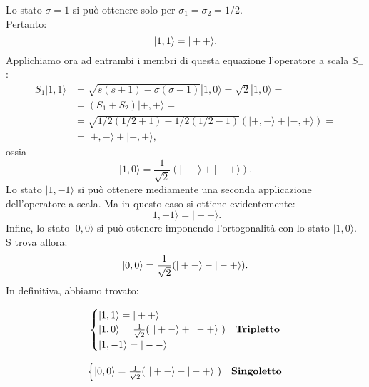 Lo stato $\sigma=1$ si può ottenere solo per $\sigma_1=\sigma_2=1/2$. \\
Pertanto:\\
\begin{equation}
|1,1\rangle = |++\rangle  .\\
\end{equation}
Applichiamo ora ad entrambi i membri di questa equazione l'operatore a scala $S_-$:
\begin{align}
 S_1 |1,1\rangle & = \sqrt{s(s+1) - \sigma(\sigma -1)}  |1,0\rangle =\sqrt{2}  |1,0\rangle= \nonumber \\
&= (S_1+S_2)  |+,+\rangle = \nonumber \\
&= \sqrt{1/2 (1/2+1) -1/2 (1/2-1)} ( |+,-\rangle + |-,+\rangle)= \nonumber \\
&= |+,-\rangle   +   |-,+\rangle ,
\end{align}
ossia
\begin{equation}
|1,0\rangle = \frac{1}{\sqrt{2}} (|+-\rangle + |-+\rangle) .
\end{equation}
Lo stato $|1,-1\rangle$ si può ottenere mediamente una seconda applicazione dell'operatore a scala. Ma in questo caso si ottiene evidentemente:
\begin{equation}
|1,-1\rangle = |--\rangle .
\end{equation}
Infine, lo stato $|0,0\rangle$ si può ottenere imponendo l'ortogonalità con lo stato $|1,0\rangle$. S trova allora:
\begin{equation}
|0,0\rangle = \frac{1}{\sqrt{2}} (|+-\rangle - |-+\rangle). \\
\end{equation}
In definitiva, abbiamo trovato:

\begin{align}
\begin{cases} 
|1,1\rangle = |++\rangle \nonumber \\
|1,0\rangle = \frac{1}{\sqrt{2}} (~|+-\rangle + |-+\rangle ~)  \nonumber  & \mbox{\textrm{\textbf{Tripletto}}} \\
|1,-1\rangle = |--\rangle  \nonumber \\
\end{cases}
\end{align}

\begin{align}
\begin{cases} 
|0,0\rangle = \frac{1}{\sqrt{2}} (~|+-\rangle - |-+\rangle~) \nonumber  & \mbox{\textrm{\textbf{Singoletto}}}\\
\end{cases}
\end{align}

